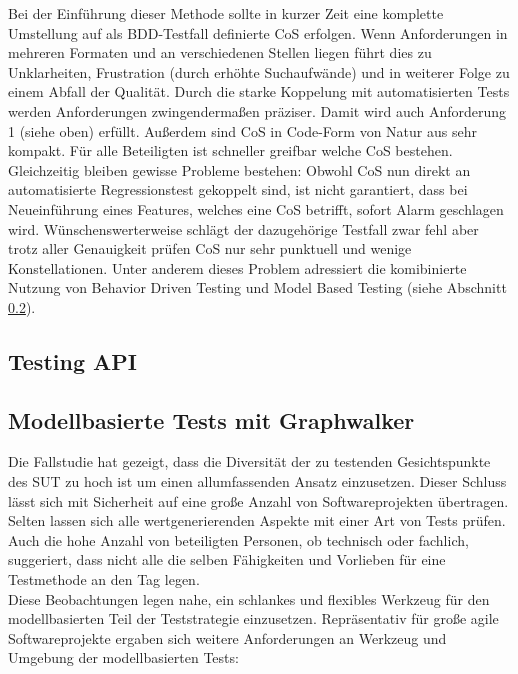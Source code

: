 Bei der Einführung dieser Methode sollte in kurzer Zeit eine komplette Umstellung auf als BDD-Testfall definierte CoS erfolgen. Wenn Anforderungen in mehreren Formaten und an verschiedenen Stellen liegen führt dies zu Unklarheiten, Frustration (durch erhöhte Suchaufwände) und in weiterer Folge zu einem Abfall der Qualität. Durch die starke Koppelung mit automatisierten Tests werden Anforderungen zwingendermaßen präziser. Damit wird auch Anforderung 1 (siehe oben) erfüllt. Außerdem sind CoS in Code-Form von Natur aus sehr kompakt. Für alle Beteiligten ist schneller greifbar welche CoS bestehen.\\
Gleichzeitig bleiben gewisse Probleme bestehen: Obwohl CoS nun direkt an automatisierte Regressionstest gekoppelt sind, ist nicht garantiert, dass bei Neueinführung eines Features, welches eine CoS betrifft, sofort Alarm geschlagen wird. Wünschenswerterweise schlägt der dazugehörige Testfall zwar fehl aber trotz aller Genauigkeit prüfen CoS nur sehr punktuell und wenige Konstellationen. Unter anderem dieses Problem adressiert die komibinierte Nutzung von Behavior Driven Testing und Model Based Testing (siehe Abschnitt \ref{sec:mbt_results}).

\subsection{Testing API}
\label{sec:testing_api}

\subsection{Modellbasierte Tests mit Graphwalker}
\label{sec:mbt_results}
Die Fallstudie hat gezeigt, dass die Diversität der zu testenden Gesichtspunkte des SUT zu hoch ist um einen allumfassenden Ansatz einzusetzen. Dieser Schluss lässt sich mit Sicherheit auf eine große Anzahl von Softwareprojekten übertragen. Selten lassen sich alle wertgenerierenden Aspekte mit einer Art von Tests prüfen. Auch die hohe Anzahl von beteiligten Personen, ob technisch oder fachlich, suggeriert, dass nicht alle die selben Fähigkeiten und Vorlieben für eine Testmethode an den Tag legen.\\
Diese Beobachtungen legen nahe, ein schlankes und flexibles Werkzeug für den modellbasierten Teil der Teststrategie einzusetzen. Repräsentativ für große agile Softwareprojekte ergaben sich weitere Anforderungen an Werkzeug und Umgebung der modellbasierten Tests:


